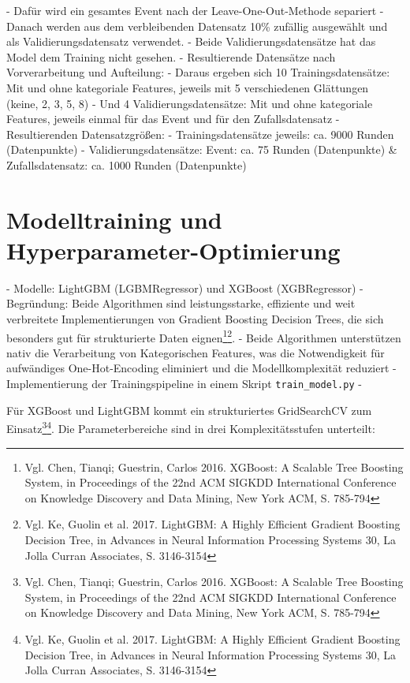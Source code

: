 - Dafür wird ein gesamtes Event nach der Leave-One-Out-Methode separiert
- Danach werden aus dem verbleibenden Datensatz 10\% zufällig ausgewählt und als Validierungsdatensatz verwendet.
- Beide Validierungsdatensätze hat das Model dem Training nicht gesehen.
- Resultierende Datensätze nach Vorverarbeitung und Aufteilung: 
- Daraus ergeben sich 10 Trainingsdatensätze: Mit und ohne kategoriale Features, jeweils mit 5 verschiedenen Glättungen (keine, 2, 3, 5, 8)
- Und 4 Validierungsdatensätze: Mit und ohne kategoriale Features, jeweils einmal für das Event und für den Zufallsdatensatz
- Resultierenden Datensatzgrößen:
- Trainingsdatensätze jeweils: ca. 9000 Runden (Datenpunkte)
- Validierungsdatensätze: Event: ca. 75 Runden (Datenpunkte) \& Zufallsdatensatz: ca. 1000 Runden (Datenpunkte)

\section{Modelltraining und Hyperparameter-Optimierung}

- Modelle: LightGBM (LGBMRegressor) und XGBoost (XGBRegressor)
- Begründung: Beide Algorithmen sind leistungsstarke, effiziente und weit verbreitete Implementierungen von Gradient Boosting Decision Trees, die sich besonders gut für strukturierte Daten eignen\footnote{Vgl. Chen, Tianqi; Guestrin, Carlos 2016. XGBoost: A Scalable Tree Boosting System, in Proceedings of the 22nd ACM SIGKDD International Conference on Knowledge Discovery and Data Mining, New York ACM, S. 785-794}\footnote{Vgl. Ke, Guolin et al. 2017. LightGBM: A Highly Efficient Gradient Boosting Decision Tree, in Advances in Neural Information Processing Systems 30, La Jolla Curran Associates, S. 3146-3154}.
- Beide Algorithmen unterstützen nativ die Verarbeitung von Kategorischen Features, was die Notwendigkeit für aufwändiges One-Hot-Encoding eliminiert und die Modellkomplexität reduziert
- Implementierung der Trainingspipeline in einem Skript \texttt{train\_model.py}
- 


Für XGBoost und LightGBM kommt ein strukturiertes GridSearchCV zum Einsatz\footnote{Vgl. Chen, Tianqi; Guestrin, Carlos 2016. XGBoost: A Scalable Tree Boosting System, in Proceedings of the 22nd ACM SIGKDD International Conference on Knowledge Discovery and Data Mining, New York ACM, S. 785-794}\footnote{Vgl. Ke, Guolin et al. 2017. LightGBM: A Highly Efficient Gradient Boosting Decision Tree, in Advances in Neural Information Processing Systems 30, La Jolla Curran Associates, S. 3146-3154}. Die Parameterbereiche sind in drei Komplexitätsstufen unterteilt:


